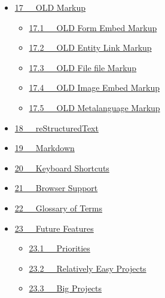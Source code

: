 \documentclass[letterpaper,10pt,english]{sphinxmanual}
\begin{document}
{\begin{minipage}{0.95\linewidth}
\begin{itemize}
\begin{itemize}
\item {} 
{\hyperref[documentation:some-useful-regular-expressions]{16.2   Some Useful Regular Expressions}}

\end{itemize}

\item {} 
{\hyperref[documentation:old-markup]{17   OLD Markup}}
\begin{itemize}
\item {} 
{\hyperref[documentation:old-form-embed-markup]{17.1   OLD Form Embed Markup}}

\item {} 
{\hyperref[documentation:old-entity-link-markup]{17.2   OLD Entity Link Markup}}

\item {} 
{\hyperref[documentation:old-file-file-markup]{17.3   OLD File file Markup}}

\item {} 
{\hyperref[documentation:old-image-embed-markup]{17.4   OLD Image Embed Markup}}

\item {} 
{\hyperref[documentation:old-metalanguage-markup]{17.5   OLD Metalanguage Markup}}

\end{itemize}

\item {} 
{\hyperref[documentation:restructuredtext]{18   reStructuredText}}

\item {} 
{\hyperref[documentation:markdown]{19   Markdown}}

\item {} 
{\hyperref[documentation:keyboard-shortcuts]{20   Keyboard Shortcuts}}

\item {} 
{\hyperref[documentation:browser-support]{21   Browser Support}}

\item {} 
{\hyperref[documentation:glossary-of-terms]{22   Glossary of Terms}}

\item {} 
{\hyperref[documentation:future-features]{23   Future Features}}
\begin{itemize}
\item {} 
{\hyperref[documentation:priorities]{23.1   Priorities}}

\item {} 
{\hyperref[documentation:relatively-easy-projects]{23.2   Relatively Easy Projects}}

\item {} 
{\hyperref[documentation:big-projects]{23.3   Big Projects}}

\end{itemize}

\end{itemize}
\end{minipage}}
\begin{center}\setlength{\fboxsep}{5pt}\end{center}
\end{document}
